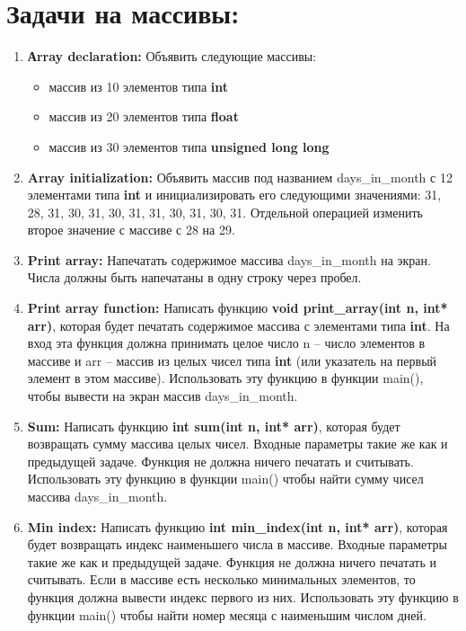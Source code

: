 \documentclass{article}
\begin{document}

\section*{Задачи на массивы:}

\begin{enumerate}
\item \textbf{Аrray declaration:} Объявить следующие массивы:
\begin{itemize}
\item массив из 10 элементов типа \textbf{int}
\item массив из 20 элементов типа \textbf{float}
\item массив из 30 элементов типа \textbf{unsigned long long}
\end{itemize}
\item \textbf{Array initialization:} Объявить массив под названием days\_in\_month с 12 элементами типа \textbf{int} и инициализировать его следующими значениями: 31, 28, 31, 30, 31, 30, 31, 31, 30, 31, 30, 31. Отдельной операцией изменить второе значение с массиве с 28 на 29.
\item \textbf{Print array:} Напечатать содержимое массива days\_in\_month на экран. Числа должны быть напечатаны в одну строку через пробел.
\item \textbf{Print array function:} Написать функцию \textbf{void print\_array(int n, int* arr)}, которая будет печатать содержимое массива с элементами типа \textbf{int}. На вход эта функция должна принимать целое число n -- число элементов в массиве и arr -- массив из целых чисел типа \textbf{int} (или указатель на первый элемент в этом массиве). Использовать эту функцию в функции main(), чтобы вывести на экран массив days\_in\_month.
\item \textbf{Sum:} Написать функцию \textbf{int sum(int n, int* arr)}, которая будет возвращать сумму массива целых чисел. Входные параметры такие же как и предыдущей задаче. Функция не должна ничего печатать и считывать. Использовать эту функцию в функции main() чтобы найти сумму чисел массива days\_in\_month.
\item \textbf{Min index:} Написать функцию \textbf{int min\_index(int n, int* arr)}, которая будет возвращать индекс наименьшего числа в массиве. Входные параметры такие же как и предыдущей задаче. Функция не должна ничего печатать и считывать. Если в массиве есть несколько минимальных элементов, то функция должна вывести индекс первого из них. Использовать эту функцию в функции main() чтобы найти номер месяца с наименьшим числом дней.


\end{enumerate}
\end{document}
